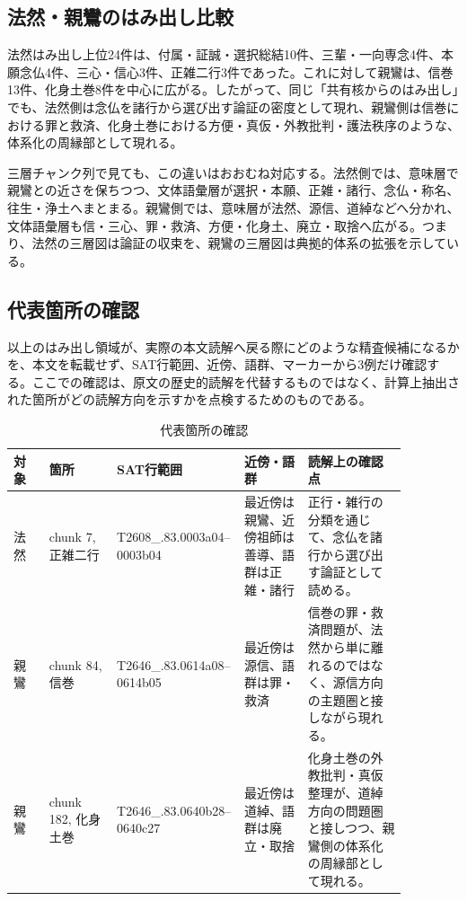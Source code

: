 \documentclass[uplatex,dvipdfmx,11pt,a4paper]{jsarticle}
\begin{document}
\subsection{法然・親鸞のはみ出し比較}

法然はみ出し上位24件は、付属・証誠・選択総結10件、三輩・一向専念4件、本願念仏4件、三心・信心3件、正雑二行3件であった。これに対して親鸞は、信巻13件、化身土巻8件を中心に広がる。したがって、同じ「共有核からのはみ出し」でも、法然側は念仏を諸行から選び出す論証の密度として現れ、親鸞側は信巻における罪と救済、化身土巻における方便・真仮・外教批判・護法秩序のような、体系化の周縁部として現れる。

三層チャンク列で見ても、この違いはおおむね対応する。法然側では、意味層で親鸞との近さを保ちつつ、文体語彙層が選択・本願、正雑・諸行、念仏・称名、往生・浄土へまとまる。親鸞側では、意味層が法然、源信、道綽などへ分かれ、文体語彙層も信・三心、罪・救済、方便・化身土、廃立・取捨へ広がる。つまり、法然の三層図は論証の収束を、親鸞の三層図は典拠的体系の拡張を示している。

\subsection{代表箇所の確認}

以上のはみ出し領域が、実際の本文読解へ戻る際にどのような精査候補になるかを、本文を転載せず、SAT行範囲、近傍、語群、マーカーから3例だけ確認する。ここでの確認は、原文の歴史的読解を代替するものではなく、計算上抽出された箇所がどの読解方向を示すかを点検するためのものである。

\begin{table}[H]
\centering
\footnotesize
\setlength{\tabcolsep}{2pt}
\caption{代表箇所の確認}
\label{tab:case-study-chunks}
\begin{tabular}{@{}p{0.09\linewidth}p{0.17\linewidth}p{0.20\linewidth}p{0.16\linewidth}p{0.25\linewidth}@{}}
\toprule
対象 & 箇所 & SAT行範囲 & 近傍・語群 & 読解上の確認点 \\
\midrule
法然 & chunk 7, 正雑二行 & T2608\_.83.0003a04--0003b04 & 最近傍は親鸞、近傍祖師は善導、語群は正雑・諸行 & 正行・雑行の分類を通じて、念仏を諸行から選び出す論証として読める。 \\
親鸞 & chunk 84, 信巻 & T2646\_.83.0614a08--0614b05 & 最近傍は源信、語群は罪・救済 & 信巻の罪・救済問題が、法然から単に離れるのではなく、源信方向の主題圏と接しながら現れる。 \\
親鸞 & chunk 182, 化身土巻 & T2646\_.83.0640b28--0640c27 & 最近傍は道綽、語群は廃立・取捨 & 化身土巻の外教批判・真仮整理が、道綽方向の問題圏と接しつつ、親鸞側の体系化の周縁部として現れる。 \\
\bottomrule
\end{tabular}
\end{table}
\end{document}
